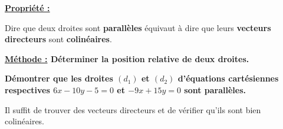 \documentclass[12pt]{article}
\begin{document}
\vspace{5pt}
\begin{mdframed}[
    linewidth=1pt,
    roundcorner=5pt,
    linecolor=Red,
    innertopmargin=10pt,
    innerbottommargin=10pt
]
{\color{red}
\textbf{\underline{Propriété :}}

\vspace{5pt}
Dire que deux droites sont \textbf{parallèles} équivaut à dire que leurs \textbf{vecteurs directeurs} 
sont \textbf{colinéaires}.
}
\end{mdframed}

\newpage
{\color{RedOrange}\textbf{\underline{Méthode :} Déterminer la position relative de deux droites.}}

\vspace{5pt}
\textbf{Démontrer que les droites $(d_1)$ et $(d_2)$ d'équations cartésiennes respectives $6x-10y-5 = 0$ et 
$-9x+15y = 0$ sont parallèles.}

\vspace{10pt}
Il suffit de trouver des vecteurs directeurs et de vérifier qu'ils sont bien colinéaires.

\vspace{0.5cm}
{\color{black!30}\dotfill}

\vspace{0.5cm}
{\color{black!30}\dotfill}

\vspace{0.5cm}
{\color{black!30}\dotfill}

\vspace{0.5cm}
{\color{black!30}\dotfill}

\vspace{0.5cm}
{\color{black!30}\dotfill}

\vspace{0.5cm}
{\color{black!30}\dotfill}

\vspace{0.5cm}
{\color{black!30}\dotfill}

\vspace{20pt}
\end{document}
